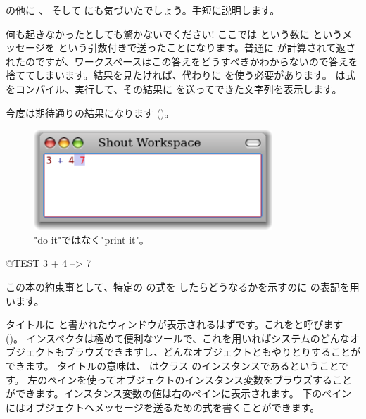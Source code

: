 \documentclass[a4paper,10pt,twoside]{book}
\begin{document}
 の他に 、 そして  にも気づいたでしょう。手短に説明します。


何も起きなかったとしても驚かないでください! ここでは  という数に \ct{+} というメッセージを  という引数付きで送ったことになります。普通に  が計算されて返されたのですが、ワークスペースはこの答えをどうすべきかわからないので答えを捨ててしまいます。結果を見たければ、代わりに  を使う必要があります。 は式をコンパイル、実行して、その結果に  を送ってできた文字列を表示します。

今度は期待通りの結果になります ()。

\begin{figure}[htb]
\centerline {\includegraphics[width=0.8\textwidth]{PrintIt}}
\caption{"do it"ではなく"print it"。}
\end{figure}

\begin{code}{@TEST}
3 + 4 --> 7
\end{code}
\noindent
この本の約束事として、特定の \pharo の式を  したらどうなるかを示すのに \ct{-->} の表記を用います。

\noindent
タイトルに  と書かれたウィンドウが表示されるはずです。これをと呼びます ()。
インスペクタは極めて便利なツールで、これを用いればシステムのどんなオブジェクトもブラウズできますし、どんなオブジェクトともやりとりすることができます。
タイトルの意味は、 はクラス  のインスタンスであるということです。
左のペインを使ってオブジェクトのインスタンス変数をブラウズすることができます。インスタンス変数の値は右のペインに表示されます。
下のペインにはオブジェクトへメッセージを送るための式を書くことができます。
\end{document}
